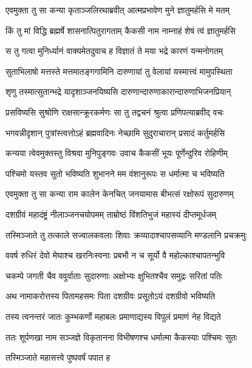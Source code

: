 \twolineshloka
{एवमुक्ता तु सा कन्या कृताञ्जलिरथाब्रवीत्}
{आत्मप्रभावेण मुने ज्ञातुमर्हसि मे मतम्} %

\twolineshloka
{किं तु मां विद्धि ब्रह्मर्षे शासनात्पितुरागताम्}
{कैकसी नाम नाम्नाहं शेषं त्वं ज्ञातुमर्हसि} %

\twolineshloka
{स तु गत्वा मुनिर्ध्यानं वाक्यमेतदुवाच ह}
{विज्ञातं ते मया भद्रे कारणं यन्मनोगतम्} %

\twolineshloka
{सुताभिलाषो मत्तस्ते मत्तमातङ्गगामिनि}
{दारुणायां तु वेलायां यस्मात्त्वं मामुपस्थिता} %

\twolineshloka
{शृणु तस्मात्सुतान्भद्रे यादृशाञ्जनयिष्यसि}
{दारुणान्दारुणाकारान्दारुणाभिजनप्रियान्} %

\twolineshloka
{प्रसविष्यसि सुश्रोणि राक्षसान्क्रूरकर्मणः}
{सा तु तद्वचनं श्रुत्वा प्रणिपत्याब्रवीद् वचः} %

\twolineshloka
{भगवन्नीदृशान् पुत्रांस्त्वत्तोऽहं ब्रह्मवादिनः}
{नेच्छामि सुदुराचारान् प्रसादं कर्तुमर्हसि} %

\twolineshloka
{कन्यया त्वेवमुक्तस्तु विश्रवा मुनिपुङ्गवः}
{उवाच कैकसीं भूयः पूर्णेन्दुरिव रोहिणीम्} %

\twolineshloka
{पश्चिमो यस्तव सुतो भविष्यति शुभानने}
{मम वंशानुरूपः स धर्मात्मा च भविष्यति} %

\twolineshloka
{एवमुक्ता तु सा कन्या राम कालेन केनचित्}
{जनयामास बीभत्सं रक्षोरूपं सुदारुणम्} %

\twolineshloka
{दशग्रीवं महादंष्ट्रं नीलाञ्जनचयोपमम्}
{ताम्रोष्ठं विंशतिभुजं महास्यं दीप्तमूर्धजम्} %

\twolineshloka
{तस्मिञ्जाते तु तत्काले सज्वालकवलाः शिवाः}
{क्रव्यादाश्चापसव्यानि मण्डलानि प्रचक्रमुः} %

\twolineshloka
{ववर्ष रुधिरं देवो मेघाश्च खरनिःस्वनाः}
{प्रबभौ न च सूर्यो वै महोल्काश्चापतन्भुवि} %

\twolineshloka
{चकम्पे जगती चैव ववुर्वाताः सुदारुणाः}
{अक्षोभ्यः क्षुभितश्चैव समुद्रः सरितां पतिः} %

\twolineshloka
{अथ नामाकरोत्तस्य पितामहसमः पिता}
{दशग्रीवः प्रसूतोऽयं दशग्रीवो भविष्यति} %

\twolineshloka
{तस्य त्वनन्तरं जातः कुम्भकर्णो महाबलः}
{प्रमाणाद्यस्य विपुलं प्रमाणं नेह विद्यते} %

\twolineshloka
{ततः शूर्पणखा नाम सञ्जज्ञे विकृतानना}
{विभीषणश्च धर्मात्मा कैकस्याः पश्चिमः सुतः} %

\onelineshloka
{तस्मिञ्जाते महासत्त्वे पुष्पवर्षं पपात ह} %

